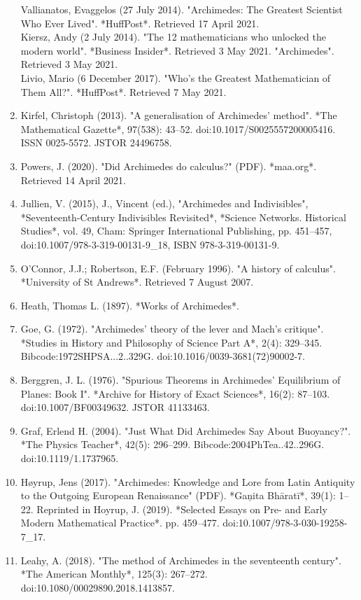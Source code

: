 \begin{enumerate}
Vallianatos, Evaggelos (27 July 2014). "Archimedes: The Greatest Scientist Who Ever Lived". *HuffPost*. Retrieved 17 April 2021.\\
Kiersz, Andy (2 July 2014). "The 12 mathematicians who unlocked the modern world". *Business Insider*. Retrieved 3 May 2021.  
  "Archimedes". Retrieved 3 May 2021.\\
Livio, Mario (6 December 2017). "Who's the Greatest Mathematician of Them All?". *HuffPost*. Retrieved 7 May 2021.
\item Kirfel, Christoph (2013). "A generalisation of Archimedes' method". *The Mathematical Gazette*, 97(538): 43–52. doi:10.1017/S0025557200005416. ISSN 0025-5572. JSTOR 24496758.
\item Powers, J. (2020). "Did Archimedes do calculus?" (PDF). *maa.org*. Retrieved 14 April 2021.
\item Jullien, V. (2015), J., Vincent (ed.), "Archimedes and Indivisibles", *Seventeenth-Century Indivisibles Revisited*, *Science Networks. Historical Studies*, vol. 49, Cham: Springer International Publishing, pp. 451–457, doi:10.1007/978-3-319-00131-9_18, ISBN 978-3-319-00131-9.
\item O'Connor, J.J.; Robertson, E.F. (February 1996). "A history of calculus". *University of St Andrews*. Retrieved 7 August 2007.
\item Heath, Thomas L. (1897). *Works of Archimedes*.
\item Goe, G. (1972). "Archimedes' theory of the lever and Mach's critique". *Studies in History and Philosophy of Science Part A*, 2(4): 329–345. Bibcode:1972SHPSA...2..329G. doi:10.1016/0039-3681(72)90002-7.
\item Berggren, J. L. (1976). "Spurious Theorems in Archimedes' Equilibrium of Planes: Book I". *Archive for History of Exact Sciences*, 16(2): 87–103. doi:10.1007/BF00349632. JSTOR 41133463.
\item Graf, Erlend H. (2004). "Just What Did Archimedes Say About Buoyancy?". *The Physics Teacher*, 42(5): 296–299. Bibcode:2004PhTea..42..296G. doi:10.1119/1.1737965.
\item Høyrup, Jens (2017). "Archimedes: Knowledge and Lore from Latin Antiquity to the Outgoing European Renaissance" (PDF). *Gaņita Bhāratī*, 39(1): 1–22. Reprinted in Hoyrup, J. (2019). *Selected Essays on Pre- and Early Modern Mathematical Practice*. pp. 459–477. doi:10.1007/978-3-030-19258-7_17.
\item Leahy, A. (2018). "The method of Archimedes in the seventeenth century". *The American Monthly*, 125(3): 267–272. doi:10.1080/00029890.2018.1413857.

\end{enumerate}
